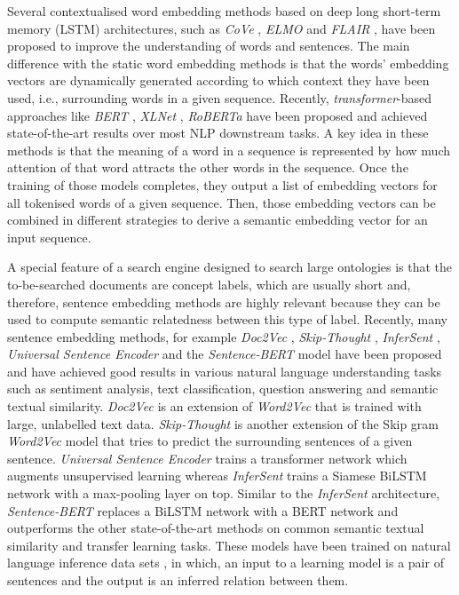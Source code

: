 \documentclass[preprint,12pt]{elsarticle}
\begin{document}
Several contextualised word embedding methods based on deep long short-term memory (LSTM) architectures, such as \textit{CoVe} \cite{Bryan2017}, \textit{ELMO} \cite{Matthew2018} and \textit{FLAIR} \cite{Akbik2018}, have been proposed to improve the understanding of words and sentences. The main difference with the static word embedding methods is that the words' embedding vectors are dynamically generated according to which context they have been used, i.e., surrounding words in a given sequence. Recently, \textit{transformer}-based approaches like \textit{BERT} \cite{Devlin2019}, \textit{XLNet} \cite{Zhilin2019}, \textit{RoBERTa} \cite{Yinhan2019} have been proposed and achieved  state-of-the-art results over most NLP downstream tasks. A key idea in these methods is that the meaning of a word in a sequence is represented by how much attention of that word attracts the other words in the sequence. Once the training of those models completes, they output a list of embedding vectors for all tokenised words of a given sequence. Then, those embedding vectors can be combined in different strategies to derive a semantic embedding vector for an input sequence.

A special feature of a search engine designed to search large ontologies is that the to-be-searched documents are concept labels, which are usually short and, therefore, sentence embedding methods are highly relevant because they can be used to compute semantic relatedness between this type of label. Recently, many sentence embedding methods, for example \textit{Doc2Vec} \cite{Quoc2014},  \textit{Skip-Thought} \cite{Ryan2015}, \textit{InferSent} \cite{Conneau2017}, \textit{Universal Sentence Encoder} \cite{Daniel2018} and the \textit{Sentence-BERT} model \cite{Reimers2019} have been proposed and have achieved good results in various natural language understanding tasks such as sentiment analysis, text classification, question answering and semantic textual similarity. \textit{Doc2Vec} is an extension of \textit{Word2Vec} that is trained with large, unlabelled text data. \textit{Skip-Thought} is another extension of the Skip gram \textit{Word2Vec} model that tries to predict the surrounding sentences of a given sentence. \textit{Universal Sentence Encoder} trains a transformer network which augments unsupervised learning whereas \textit{InferSent} trains a Siamese BiLSTM network with a max-pooling layer on top. Similar to the \textit{InferSent} architecture, \textit{Sentence-BERT} replaces a BiLSTM network with a BERT network and outperforms the other state-of-the-art methods on common semantic textual similarity and transfer learning tasks. These models have been trained on natural language inference data sets \cite{Samuel2015, Adina2018}, in which, an input to a learning model is a pair of sentences and the output is an inferred relation between them.
\end{document}
